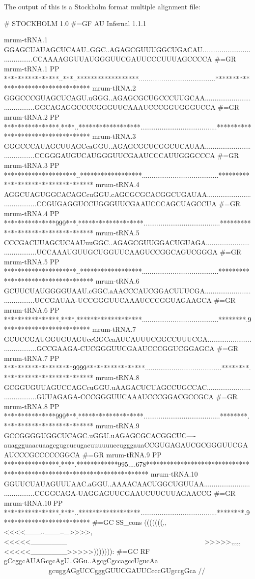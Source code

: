 The output of this is a Stockholm format multiple alignment file:

\begin{tinysreoutput}
# STOCKHOLM 1.0
#=GF AU Infernal 1.1.1

mrum-tRNA.1          GGAGCUAUAGCUCAAU..GGC..AGAGCGUUUGGCUGACAU........................................CCAAAAGGUUAUGGGUUCGAUUCCCUUUAGCCCCA
#=GR mrum-tRNA.1  PP ****************..***..******************........................................***********************************
mrum-tRNA.2          GGGCCCGUAGCUCAGU.uGGG..AGAGCGCUGCCCUUGCAA........................................GGCAGAGGCCCCGGGUUCAAAUCCCGGUGGGUCCA
#=GR mrum-tRNA.2  PP ****************.****..******************........................................***********************************
mrum-tRNA.3          GGGCCCAUAGCUUAGCcaGGU..AGAGCGCUCGGCUCAUAA........................................CCGGGAUGUCAUGGGUUCGAAUCCCAUUGGGCCCA
#=GR mrum-tRNA.3  PP *********************..******************........................................***********************************
mrum-tRNA.4          AGGCUAGUGGCACAGCcuGGU.cAGCGCGCACGGCUGAUAA........................................CCGUGAGGUCCUGGGUUCGAAUCCCAGCUAGCCUA
#=GR mrum-tRNA.4  PP ***************999***.*******************........................................***********************************
mrum-tRNA.5          CCCGACUUAGCUCAAUuuGGC..AGAGCGUUGGACUGUAGA........................................UCCAAAUGUUGCUGGUUCAAGUCCGGCAGUCGGGA
#=GR mrum-tRNA.5  PP *********************..******************........................................***********************************
mrum-tRNA.6          GCUUCUAUGGGGUAAU.cGGC.aAACCCAUCGGACUUUCGA........................................UCCGAUAA-UCCGGGUUCAAAUCCCGGUAGAAGCA
#=GR mrum-tRNA.6  PP ****************.****.*******************........................................********.9*************************
mrum-tRNA.7          GCUCCGAUGGUGUAGUccGGCcaAUCAUUUCGGCCUUUCGA........................................GCCGAAGA-CUCGGGUUCGAAUCCCGGUCGGAGCA
#=GR mrum-tRNA.7  PP ********************9999*****************........................................********.**************************
mrum-tRNA.8          GCGGUGUUAGUCCAGCcuGGU.uAAGACUCUAGCCUGCCAC........................................GUUAGAGA-CCCGGGUUCAAAUCCCGGACGCCGCA
#=GR mrum-tRNA.8  PP ***************999***.*******************........................................********.**************************
mrum-tRNA.9          GCCGGGGUGGCUCAGC.uGGU.uAGAGCGCACGGCUC----auaggguaacuaagcgugcucugacuuuuuuccugggauaCCGUGAGAUCGCGGGUUCGAAUCCCGCCCCCGGCA
#=GR mrum-tRNA.9  PP ****************.****.************995....678************************************************************************
mrum-tRNA.10         GGUUCUAUAGUUUAAC.aGGU..AAAACAACUGGCUGUUAA........................................CCGGCAGA-UAGGAGUUCGAAUCUUCUUAGAACCG
#=GR mrum-tRNA.10 PP ****************.****..******************........................................********.9*************************
#=GC SS_cons         (((((((,,<<<<___..___.._>>>>,<<<<<_______~~~~~~~~~~~~~~~~~~~~~~~~~~~~~~~~~~~~~~~~>>>>>,,,,,<<<<<_______>>>>>))))))):
#=GC RF              gCcggcAUAGcgcAgU..GGu..AgcgCgccagccUgucAa~~~~~~~~~~~~~~~~~~~~~~~~~~~~~~~~~~~~~~~~gcuggAGgUCCgggGUUCGAUUCcccGUgccgGca
//
\end{tinysreoutput}

